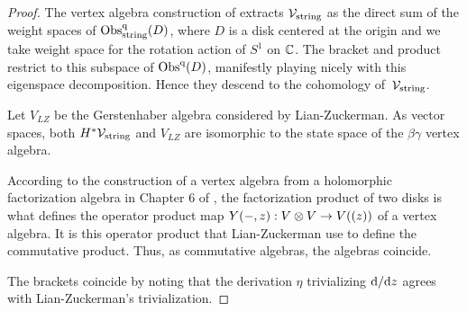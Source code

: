\begin{proof}
The vertex algebra construction of \cite{CG1} extracts $\mathcal{V}_{\rm string}$ as the direct sum of the weight spaces of ${\rm Obs}^{\rm q}_{\rm string}(D)$, 
where $D$ is a disk centered at the origin and we take weight space for the rotation action of $S^1$ on $\mathbb C$.
The bracket and product restrict to this subspace of ${\rm Obs}^{\rm q}(D)$,
manifestly playing nicely with this eigenspace decomposition. 
Hence they descend to the cohomology of~$\mathcal{V}_{\rm string}$.

Let $V_{LZ}$ be the Gerstenhaber algebra considered by Lian-Zuckerman.
As vector spaces, both $H^* \mathcal{V}_{\rm string}$ and $V_{LZ}$ are isomorphic to the state space of the $\beta\gamma$ vertex algebra.

According to the construction of a vertex algebra from a holomorphic factorization algebra in Chapter 6 of \cite{CG1}, the factorization product of two disks is what defines the operator product map $Y(-,z) : V \otimes V \to V ((z))$ of a vertex algebra.
It is this operator product that Lian-Zuckerman use to define the commutative product.
Thus, as commutative algebras, the algebras coincide. 

The brackets coincide by noting that the derivation $\eta$ trivializing ${\rm d} / {\rm d} z$ agrees with Lian-Zuckerman's trivialization.
\end{proof}

